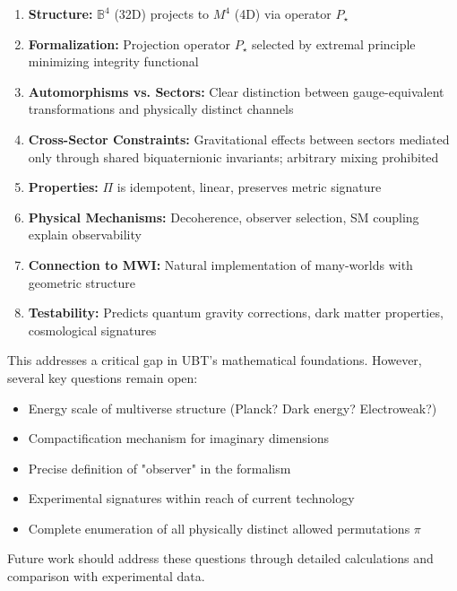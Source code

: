 \begin{enumerate}
\item \textbf{Structure:} $\mathbb{B}^4$ (32D) projects to $M^4$ (4D) via operator $P_\star$
\item \textbf{Formalization:} Projection operator $P_\star$ selected by extremal principle minimizing integrity functional
\item \textbf{Automorphisms vs. Sectors:} Clear distinction between gauge-equivalent transformations and physically distinct channels
\item \textbf{Cross-Sector Constraints:} Gravitational effects between sectors mediated only through shared biquaternionic invariants; arbitrary mixing prohibited
\item \textbf{Properties:} $\Pi$ is idempotent, linear, preserves metric signature
\item \textbf{Physical Mechanisms:} Decoherence, observer selection, SM coupling explain observability
\item \textbf{Connection to MWI:} Natural implementation of many-worlds with geometric structure
\item \textbf{Testability:} Predicts quantum gravity corrections, dark matter properties, cosmological signatures
\end{enumerate}

This addresses a critical gap in UBT's mathematical foundations. However, several key questions remain open:
\begin{itemize}
\item Energy scale of multiverse structure (Planck? Dark energy? Electroweak?)
\item Compactification mechanism for imaginary dimensions
\item Precise definition of "observer" in the formalism
\item Experimental signatures within reach of current technology
\item Complete enumeration of all physically distinct allowed permutations $\pi$
\end{itemize}

Future work should address these questions through detailed calculations and comparison with experimental data.
